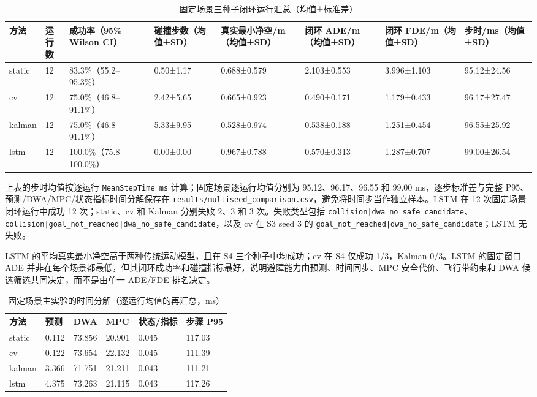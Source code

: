 \documentclass[11pt,a4paper]{ctexart}
\begin{document}
\begin{table}[t]
\centering
\small
\caption{固定场景三种子闭环运行汇总（均值±标准差）}
\label{tab:table-3}
\begin{tabularx}{\linewidth}{YYYYYYYY}
\toprule
方法 & 运行数 & 成功率（95\% Wilson CI） & 碰撞步数（均值±SD） & 真实最小净空/m（均值±SD） & 闭环 ADE/m（均值±SD） & 闭环 FDE/m（均值±SD） & 步时/ms（均值±SD） \\
\midrule
static & 12 & 83.3\%（55.2–95.3\%） & 0.50±1.17 & 0.688±0.579 & 2.103±0.553 & 3.996±1.103 & 95.12±24.56 \\
cv & 12 & 75.0\%（46.8–91.1\%） & 2.42±5.65 & 0.665±0.923 & 0.490±0.171 & 1.179±0.433 & 96.17±27.47 \\
kalman & 12 & 75.0\%（46.8–91.1\%） & 5.33±9.95 & 0.528±0.974 & 0.538±0.188 & 1.251±0.454 & 96.55±25.92 \\
lstm & 12 & 100.0\%（75.8–100.0\%） & 0.00±0.00 & 0.967±0.788 & 0.570±0.313 & 1.287±0.707 & 99.00±26.54 \\
\bottomrule
\end{tabularx}
\end{table}

上表的步时均值按逐运行 \texttt{MeanStepTime\_ms} 计算；固定场景逐运行均值分别为 95.12、96.17、96.55 和 99.00 ms，逐步标准差与完整 P95、预测/DWA/MPC/状态指标时间分解保存在 \texttt{results/multiseed\_comparison.csv}，避免将时间步当作独立样本。LSTM 在 12 次固定场景闭环运行中成功 12 次；static、cv 和 Kalman 分别失败 2、3 和 3 次。失败类型包括 \texttt{collision|dwa\_no\_safe\_candidate}、\texttt{collision|goal\_not\_reached|dwa\_no\_safe\_candidate}，以及 cv 在 S3 seed 3 的 \texttt{goal\_not\_reached|dwa\_no\_safe\_candidate}；LSTM 无失败。

LSTM 的平均真实最小净空高于两种传统运动模型，且在 S4 三个种子中均成功；cv 在 S4 仅成功 1/3，Kalman 0/3。LSTM 的固定窗口 ADE 并非在每个场景都最低，但其闭环成功率和碰撞指标最好，说明避障能力由预测、时间同步、MPC 安全代价、飞行带约束和 DWA 候选筛选共同决定，而不是由单一 ADE/FDE 排名决定。

\begin{table}[t]
\centering
\small
\caption{固定场景主实验的时间分解（逐运行均值的再汇总，ms）}
\label{tab:table-4}
\begin{tabularx}{\linewidth}{YYYYYY}
\toprule
方法 & 预测 & DWA & MPC & 状态/指标 & 步骤 P95 \\
\midrule
static & 0.112 & 73.856 & 20.901 & 0.045 & 117.03 \\
cv & 0.122 & 73.654 & 22.132 & 0.045 & 111.39 \\
kalman & 3.366 & 71.751 & 21.211 & 0.043 & 111.21 \\
lstm & 4.375 & 73.263 & 21.115 & 0.043 & 117.26 \\
\bottomrule
\end{tabularx}
\end{table}
\end{document}
